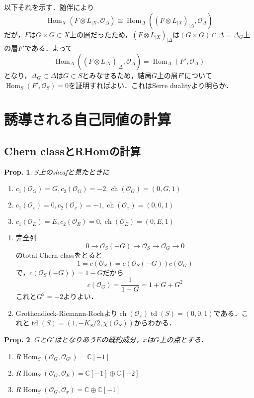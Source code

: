 \documentclass[uplatex,a4paper,11pt,dvipdfmx]{jsarticle}
\makeatletter
\theoremstyle{mystyle} %
\newtheorem{proposition}{Prop.}[section]
\renewenvironment{proof}[1][\proofname]{\par
 \pushQED{\qed}%
 \normalfont \topsep6\p@\@plus6\p@\relax
 \trivlist
 \item[\hskip\labelsep
 \itshape
 {\bf\underline{#1}}]\ignorespaces
}{%
 \popQED\endtrivlist\@endpefalse
}
\DeclareMathOperator{\Hom}{Hom}
\DeclareMathOperator{\ch}{ch}
\DeclareMathOperator{\td}{td}
\makeatother
\begin{document}
\begin{proof}
	以下それを示す．随伴により$$\Hom_X(F\otimes L_{|X}, \mathcal{O}_\Delta)\cong\Hom_\Delta((F\otimes L_{|X})_{|\Delta}, \mathcal{O}_\Delta)$$だが，$F$は$G \times G \subset X$上の層だったため，$(F\otimes L_{|X})_{|\Delta}$は$(G \times G) \cap \Delta = \Delta_G$上の層$F'$である．よって$$\Hom_\Delta((F\otimes L_{|X})_{|\Delta}, \mathcal{O}_\Delta)=\Hom_\Delta(F', \mathcal{O}_\Delta)$$となり，$\Delta_G \subset \Delta$は$G \subset S$とみなせるため，結局$G$上の層$F'$について$\Hom_S(F', \mathcal{O}_S)=0$を証明すればよい．これはSerre dualityより明らか．
\end{proof}

\section{誘導される自己同値の計算}
\subsection{Chern classとRHomの計算}
\begin{proposition}
	$S$上のsheafと見たときに
	\begin{enumerate}
		\item $c_1(\mathcal{O}_G) = G, c_2(\mathcal{O}_G) = -2, \ch(\mathcal{O}_G) = (0, G, 1)$
		\item $c_1(\mathcal{O}_x) = 0, c_2(\mathcal{O}_x) = -1, \ch(\mathcal{O}_x) = (0, 0, 1)$
		\item $c_1(\mathcal{O}_E) = E, c_2(\mathcal{O}_E) = 0, \ch(\mathcal{O}_E) = (0, E, 1)$
	\end{enumerate}
\end{proposition}
\begin{proof}
	\begin{enumerate}
		\item 完全列$$0 \to \mathcal{O}_S(-G) \to \mathcal{O}_S \to \mathcal{O}_G \to 0$$のtotal Chern classをとると$$1 = c(\mathcal{O}_S) = c(\mathcal{O}_S(-G))c(\mathcal{O}_G)$$で，$c(\mathcal{O}_S(-G)) = 1-G$だから$$c(\mathcal{O}_G) = \frac{1}{1-G} = 1+G+G^2$$これと$G^2=-2$よりよい．
		\item Grothendieck-Riemann-Rochより$\ch(\mathcal{O}_x)\td(S) = (0, 0, 1)$である．これと$\td(S) = (1, -K_S/2, \chi(\mathcal{O}_S))$からわかる．
	\end{enumerate}
\end{proof}
\begin{proposition}
	$G$と$G'$はとなりあう$E$の既約成分，$x$は$G$上の点とする．
	\begin{enumerate}
		\item $R\Hom_S(\mathcal{O}_G, \mathcal{O}_{G'}) = \mathbb{C}[-1]$
		\item $R\Hom_S(\mathcal{O}_G, \mathcal{O}_E) = \mathbb{C}[-1]\oplus\mathbb{C}[-2]$
		\item $R\Hom_S(\mathcal{O}_G, \mathcal{O}_x) = \mathbb{C}\oplus\mathbb{C}[-1]$
	\end{enumerate}
\end{proposition}
\end{document}
